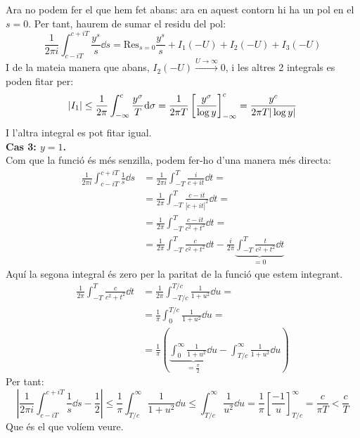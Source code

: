 \documentclass{report}
\begin{document}
{\begin{center}
\end{center}
Ara no podem fer el que hem fet abans: ara en aquest contorn hi ha un pol en el $s=0$. Per tant, haurem de sumar el residu del pol:
\[
    \frac{1}{2\pi i}\int_{c-iT}^{c+iT}\frac{y^s}{s}\dd s=\mathrm{Res}_{s=0} \frac{y^s}{s}+I_1(-U)+I_2(-U)+I_3(-U)
\]
I de la mateia manera que abans, $I_2(-U)\xrightarrow{U\to\infty}0$, i les altres 2 integrals es poden fitar per:
\[
    |I_1|\leq\frac{1}{2\pi}\int_{-\infty}^c \frac{y^\sigma}{T}\mathrm{d} \sigma=\frac{1}{2\pi T}\left[\frac{y^\sigma}{\log y}\right]_{-\infty}^c=\frac{y^c}{2\pi T |\log y|}
\]
I l'altra integral es pot fitar igual.\\
\textbf{Cas 3: $y=1$.}\\
Com que la funció és més senzilla, podem fer-ho d'una manera més directa:
\begin{align*}
    \frac{1}{2\pi i}\int_{c-iT}^{c+iT}\frac{1}{s}\dd s&=
    \frac{1}{2\pi i}\int_{-T}^{T}\frac{i}{c+it}\dd t =\\
    &=\frac{1}{2\pi}\int_{-T}^{T}\frac{c-it}{|c+it|^2}\dd t =\\
    &=\frac{1}{2\pi}\int_{-T}^{T}\frac{c-it}{c^2+t^2}\dd t =\\
    &=\frac{1}{2\pi}\int_{-T}^{T}\frac{c}{c^2+t^2}\dd t 
    -\frac{i}{2\pi}\underbrace{\int_{-T}^{T}\frac{t}{c^2+t^2}\dd t}_{=0}
\end{align*}
Aquí la segona integral és zero per la paritat de la funció que estem integrant.
\begin{align*}
    \frac{1}{2\pi}\int_{-T}^{T}\frac{c}{c^2+t^2}\dd t 
    &=\frac{1}{2\pi}\int_{-T/c}^{T/c}\frac{1}{1+u^2}\dd u =\\
    &=\frac{1}{\pi}\int_{0}^{T/c}\frac{1}{1+u^2}\dd u =\\
    &=\frac{1}{\pi}\left(\underbrace{\int_{0}^{\infty}\frac{1}{1+u^2}\dd u}_{=\frac{\pi}{2}}-\int_{T/c}^{\infty}\frac{1}{1+u^2}\dd u\right)
\end{align*}
Per tant:
\[
    \left|\frac{1}{2\pi i}\int_{c-iT}^{c+iT}\frac{1}{s}\dd s-\frac{1}{2}\right|\leq\frac{1}{\pi}\int_{T/c}^\infty\frac{1}{1+u^2}\dd u\leq \int_{T/c}^{\infty}\frac{1}{u^2}\dd u= \frac{1}{\pi}\left[\frac{-1}{u}\right]_{T/c}^\infty=\frac{c}{\pi T}<\frac{c}{T}
\]
Que és el que volíem veure.    
}
\end{document}

